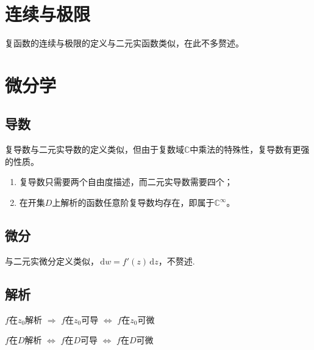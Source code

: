 \documentclass[UTF8,fontset=fandol,zihao=5]{ctexart}
\newcommand{\CC}{\mathbb{C}}
\newcommand{\dd}{\,\mathrm{d}}
\begin{document}
\section{连续与极限}

复函数的连续与极限的定义与二元实函数类似，在此不多赘述。

\section{微分学}

\subsection{导数}
  
  复导数与二元实导数的定义类似，但由于复数域$\CC$中乘法的特殊性，复导数有更强的性质。
  
  \begin{enumerate}
    
    \item 复导数只需要两个自由度描述，而二元实导数需要四个；
    
    \item 在开集$D$上解析的函数任意阶复导数均存在，即属于$\CC^{\infty}$。
  
  \end{enumerate}

\subsection{微分}

与二元实微分定义类似，$\dd w = f'(z) \dd z$，不赘述.

\subsection{解析}

\begin{methodbox}

  $f$在$z_0$解析 $\Rightarrow$ $f$在$z_0$可导 $\Leftrightarrow$ $f$在$z_0$可微
  
  $f$在$D$解析 $\Leftrightarrow$ $f$在$D$可导 $\Leftrightarrow$ $f$在$D$可微

\end{methodbox}
\end{document}
